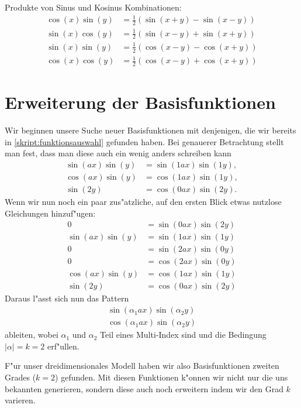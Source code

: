 \begin{refsection}
Produkte von Sinus und Kosinus Kombinationen:
\begin{align*}
\cos(x)\sin(y) &= \frac{1}{2} \left(\sin(x + y) - \sin(x - y)\right)
\\
\sin(x)\cos(y) &= \frac{1}{2} \left(\sin(x - y) + \sin(x + y)\right)
\\
\sin(x)\sin(y) &= \frac{1}{2} \left(\cos(x - y) - \cos(x + y)\right)
\\
\cos(x)\cos(y) &= \frac{1}{2} \left(\cos(x - y) + \cos(x + y)\right)
\end{align*}

\section{Erweiterung der Basisfunktionen\label{section:lorenz2:basic_function}}
Wir beginnen unsere Suche neuer Basisfunktionen mit denjenigen, die wir bereits 
in \cref{skript:funktionsauswahl} gefunden haben. Bei genauerer Betrachtung 
stellt man fest, dass man diese auch ein wenig anders schreiben kann
\begin{align*}
\sin(ax)\sin(y) &= \sin(1ax)\sin(1y),\\
\cos(ax)\sin(y) &= \cos(1ax)\sin(1y),\\
\sin(2y) &= \cos(0ax)\sin(2y).
\end{align*}
Wenn wir nun noch ein paar zus"atzliche, auf den ersten Blick etwas nutzlose 
Gleichungen hinzuf"ugen:
\begin{align*}
0 &= \sin(0ax)\sin(2y) \\
\sin(ax)\sin(y) &= \sin(1ax)\sin(1y)\\
0 &= \sin(2ax)\sin(0y) \\
0 &= \cos(2ax)\sin(0y)\\
\cos(ax)\sin(y) &= \cos(1ax)\sin(1y)\\
\sin(2y) &= \cos(0ax)\sin(2y)
\end{align*}
Daraus l"asst sich nun das Pattern
\begin{equation}
\begin{split}
\sin(\alpha_1 ax)\sin(\alpha_2 y) \\
\cos(\alpha_1 ax)\sin(\alpha_2 y)
\end{split}
\label{equation:lorenz2:basic-functions}
\end{equation}
ableiten, wobei $\alpha_1$ und $\alpha_2$ Teil eines Multi-Index sind und die 
Bedingung $|\alpha| = k = 2$ erf"ullen.

F"ur unser dreidimensionales Modell haben wir also Basisfunktionen zweiten 
Grades ($k = 2$) gefunden. Mit diesen Funktionen k"onnen wir nicht nur die uns 
bekannten generieren, sondern diese auch noch erweitern indem wir den Grad $k$ 
varieren.


\end{refsection}
